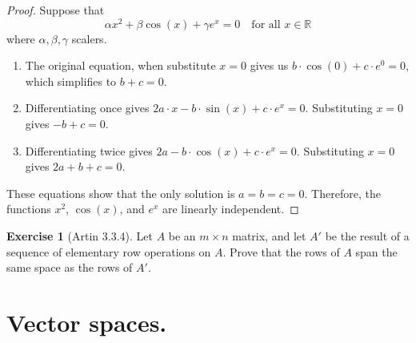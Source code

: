 \documentclass[
]{book}
\providecommand{\tightlist}{%
  \setlength{\itemsep}{0pt}\setlength{\parskip}{0pt}}
\theoremstyle{definition}
\theoremstyle{definition}
\theoremstyle{definition}
\newtheorem{exercise}{Exercise}[chapter]
\theoremstyle{definition}
\theoremstyle{remark}
\begin{document}
\begin{proof}
Suppose that \[\alpha x^2+ \beta \cos(x) +\gamma e^x =0\quad \text{for all } x\in \mathbb{R}\]
where \(\alpha,\beta,\gamma\) scalers.

\begin{enumerate}
\def\labelenumi{\arabic{enumi}.}
\tightlist
\item
  The original equation, when substitute \(x=0\) gives us \(b \cdot \cos(0) + c \cdot e^0 = 0\), which simplifies to \(b + c = 0\).
\item
  Differentiating once gives \(2a \cdot x - b \cdot \sin(x) + c \cdot e^x = 0\). Substituting \(x = 0\) gives \(-b + c = 0\).
\item
  Differentiating twice gives \(2a - b \cdot \cos(x) + c \cdot e^x = 0\). Substituting \(x = 0\) gives \(2a + b + c = 0\).
\end{enumerate}

These equations show that the only solution is \(a = b = c = 0\). Therefore, the functions \(x^2\), \(\cos(x)\), and \(e^x\) are linearly independent.
\end{proof}

\begin{exercise}[Artin 3.3.4]
\protect\hypertarget{exr:unnamed-chunk-291}{}\label{exr:unnamed-chunk-291}Let \(A\) be an \(m \times n\) matrix, and let \(A'\) be the result of a sequence of elementary row operations on \(A\). Prove that the rows of \(A\) span the same space as the rows of \(A'\).
\end{exercise}

\hypertarget{vector-spaces.}{%
\chapter{Vector spaces.}\label{vector-spaces.}}

  
\end{document}
